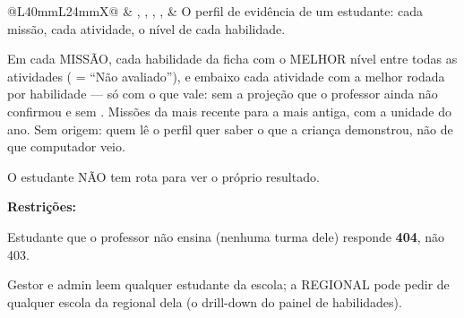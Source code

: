 \begin{tabularx}{\linewidth}{@{}L{40mm}L{24mm}X@{}}
\zebra {} & , , , ,  & O perfil de evidência de um estudante: cada missão, cada atividade, o nível de cada habilidade.\par Em cada MISSÃO, cada habilidade da ficha com o MELHOR nível entre todas as atividades ( = \enquote{Não avaliado}), e embaixo cada atividade com a melhor rodada por habilidade --- só com o que vale: sem a projeção que o professor ainda não confirmou e sem . Missões da mais recente para a mais antiga, com a unidade do ano. Sem origem: quem lê o perfil quer saber o que a criança demonstrou, não de que computador veio.\par O estudante NÃO tem rota para ver o próprio resultado.\par \textbf{Restrições:}\par \hspace*{1em}\textbullet{} Estudante que o professor não ensina (nenhuma turma dele) responde \textbf{404}, não 403.\par \hspace*{1em}\textbullet{} Gestor e admin leem qualquer estudante da escola; a REGIONAL pode pedir  de qualquer escola da regional dela (o drill-down do painel de habilidades).\\

\end{tabularx}
